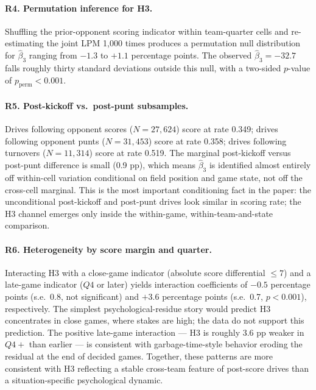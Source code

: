 \documentclass[11pt]{article}
\begin{document}
\paragraph{R4. Permutation inference for H3.} Shuffling the prior-opponent
scoring indicator within team-quarter cells and re-estimating the joint
LPM 1{,}000 times produces a permutation null distribution for
$\hat\beta_3$ ranging from $-1.3$ to $+1.1$ percentage points. The observed
$\hat\beta_3 = -32.7$ falls roughly thirty standard deviations outside this
null, with a two-sided $p$-value of $p_{\text{perm}} < 0.001$.

\paragraph{R5. Post-kickoff vs.\ post-punt subsamples.} Drives following
opponent scores ($N = 27{,}624$) score at rate 0.349; drives following
opponent punts ($N = 31{,}453$) score at rate 0.358; drives following
turnovers ($N = 11{,}314$) score at rate 0.519. The marginal post-kickoff
versus post-punt difference is small (0.9 pp), which means $\hat\beta_3$
is identified almost entirely off within-cell variation conditional on
field position and game state, not off the cross-cell marginal. This is
the most important conditioning fact in the paper: the unconditional
post-kickoff and post-punt drives look similar in scoring rate; the
H3 channel emerges only inside the within-game, within-team-and-state
comparison.

\paragraph{R6. Heterogeneity by score margin and quarter.} Interacting H3
with a close-game indicator (absolute score differential $\leq 7$) and a
late-game indicator ($Q4$ or later) yields interaction coefficients
of $-0.5$ percentage points (s.e.\ 0.8, not significant) and $+3.6$
percentage points (s.e.\ 0.7, $p<0.001$), respectively. The simplest
psychological-residue story would predict H3 concentrates in close games,
where stakes are high; the data do not support this prediction. The
positive late-game interaction --- H3 is roughly 3.6 pp weaker in $Q4+$
than earlier --- is consistent with garbage-time-style behavior eroding
the residual at the end of decided games. Together, these patterns are
more consistent with H3 reflecting a stable cross-team feature of
post-score drives than a situation-specific psychological dynamic.
\end{document}
